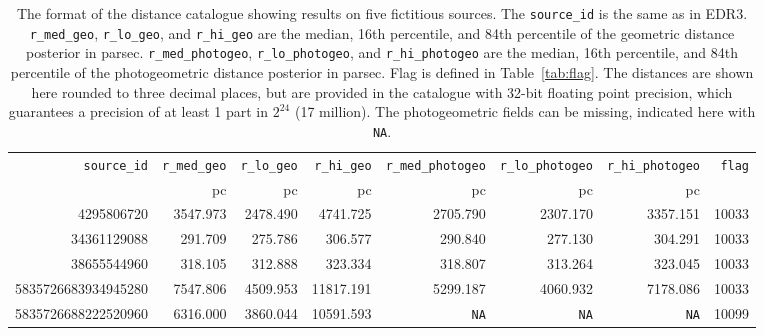 \documentclass[twocolumn]{aastex62}
\providecommand{\release}{EDR3}
\begin{document}
\begin{table}
\begin{center}
\caption{The format of the distance catalogue showing results on five fictitious sources.
The {\tt source\_id} is the same as in \release. 
 {\tt r\_med\_geo}, {\tt r\_lo\_geo}, and {\tt r\_hi\_geo} are the median, 16th percentile, and 84th percentile of the geometric distance posterior in parsec.
{\tt r\_med\_photogeo}, {\tt r\_lo\_photogeo}, and {\tt r\_hi\_photogeo} are the median, 16th percentile, and 84th percentile of the photogeometric distance posterior in parsec. 
Flag is defined in Table~\ref{tab:flag}.
The distances are shown here rounded to three decimal places, but are provided in the catalogue with 32-bit floating point precision, which guarantees a precision of at least 1 part in $2^{24}$ (17 million).
The photogeometric fields can be missing, indicated here with {\tt NA}.
\label{tab:catalogue_extract}
}
\begin{tabular}{rrrrrrrr}
\hline
{\tt source\_id} & {\tt r\_med\_geo} & {\tt r\_lo\_geo} & {\tt r\_hi\_geo} & {\tt r\_med\_photogeo} & {\tt r\_lo\_photogeo} & {\tt r\_hi\_photogeo} & {\tt flag} \\
                 & pc & pc & pc &  pc & pc & pc & \\
\hline
4295806720 & 3547.973 & 2478.490 & 4741.725 & 2705.790 & 2307.170 & 3357.151 & 10033 \\
34361129088 & 291.709 & 275.786 & 306.577 & 290.840 & 277.130 & 304.291 & 10033 \\
38655544960 & 318.105 & 312.888 & 323.334 & 318.807 & 313.264 & 323.045 & 10033 \\
5835726683934945280 & 7547.806 & 4509.953 & 11817.191 & 5299.187 & 4060.932 & 7178.086 & 10033 \\
5835726688222520960 & 6316.000 & 3860.044 & 10591.593 & {\tt NA} & {\tt NA} & {\tt NA} & 10099 \\
\hline
\end{tabular}
\end{center}
\end{table}
\end{document}
